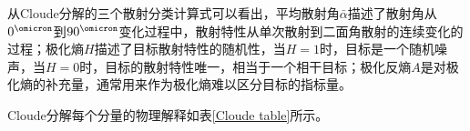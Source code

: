 从Cloude分解的三个散射分类计算式可以看出，平均散射角$\bar{\alpha}$描述了散射角从$0^{\operatorname{\omicron}}$到$90^{\operatorname{\omicron}}$变化过程中，散射特性从单次散射到二面角散射的连续变化的过程；极化熵$H$描述了目标散射特性的随机性，当$H=1$时，目标是一个随机噪声，当$H=0$时，目标的散射特性唯一，相当于一个相干目标；极化反熵$A$是对极化熵的补充量，通常用来作为极化熵难以区分目标的指标量。

Cloude分解每个分量的物理解释如表\ref{Cloude table}所示。
\begin{table}[h]
    \caption{Cloude分解}
    \label{Cloude table}
\end{table}

